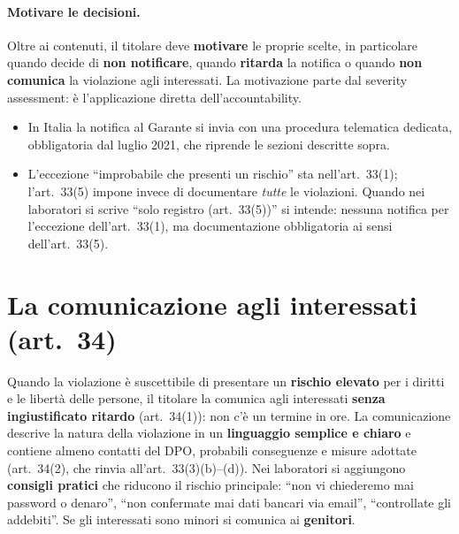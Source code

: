 \paragraph{Motivare le decisioni.} Oltre ai contenuti, il titolare deve \textbf{motivare} le proprie
scelte, in particolare quando decide di \textbf{non notificare}, quando \textbf{ritarda} la notifica o
quando \textbf{non comunica} la violazione agli interessati. La motivazione parte dal severity
assessment: è l'applicazione diretta dell'accountability.

\begin{integrazione}
\begin{itemize}
  \item In Italia la notifica al Garante si invia con una procedura telematica dedicata, obbligatoria
    dal luglio 2021, che riprende le sezioni descritte sopra.
  \item L'eccezione ``improbabile che presenti un rischio'' sta nell'art.~33(1); l'art.~33(5) impone
    invece di documentare \emph{tutte} le violazioni. Quando nei laboratori si scrive ``solo registro
    (art.~33(5))'' si intende: nessuna notifica per l'eccezione dell'art.~33(1), ma documentazione
    obbligatoria ai sensi dell'art.~33(5).
\end{itemize}
\end{integrazione}

\section{La comunicazione agli interessati (art.~34)}
\label{sec:breach-art34}

Quando la violazione è suscettibile di presentare un \textbf{rischio elevato} per i diritti e le
libertà delle persone, il titolare la comunica agli interessati \textbf{senza ingiustificato ritardo}
(art.~34(1)): non c'è un termine in ore. La comunicazione descrive la natura della violazione in un
\textbf{linguaggio semplice e chiaro} e contiene almeno contatti del DPO, probabili conseguenze e misure
adottate (art.~34(2), che rinvia all'art.~33(3)(b)--(d)). Nei laboratori si aggiungono \textbf{consigli
pratici} che riducono il rischio principale: ``non vi chiederemo mai password o denaro'', ``non
confermate mai dati bancari via email'', ``controllate gli addebiti''. Se gli interessati sono minori si
comunica ai \textbf{genitori}.

